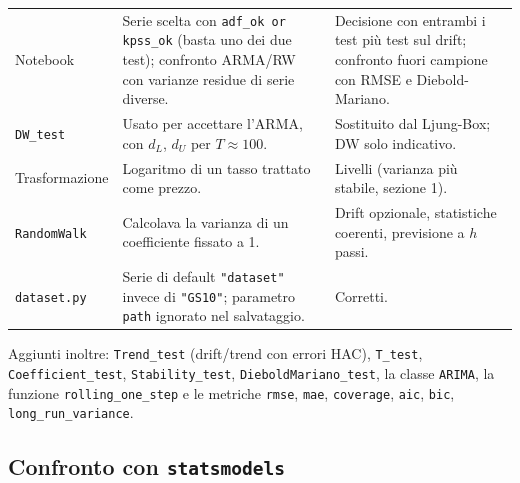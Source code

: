 \documentclass[11pt,a4paper]{article}
\begin{document}
\begin{center}
\begin{tabular}{>{\raggedright\arraybackslash}p{3.2cm}>{\raggedright\arraybackslash}p{5.9cm}>{\raggedright\arraybackslash}p{5.5cm}}
Notebook & Serie scelta con \texttt{adf\_ok or kpss\_ok} (basta uno dei due test); confronto ARMA/RW con varianze residue di serie diverse. & Decisione con entrambi i test più test sul drift; confronto fuori campione con RMSE e Diebold-Mariano. \\
\texttt{DW\_test} & Usato per accettare l'ARMA, con $d_L$, $d_U$ per $T\approx100$. & Sostituito dal Ljung-Box; DW solo indicativo. \\
Trasformazione & Logaritmo di un tasso trattato come prezzo. & Livelli (varianza più stabile, sezione 1). \\
\texttt{RandomWalk} & Calcolava la varianza di un coefficiente fissato a 1. & Drift opzionale, statistiche coerenti, previsione a $h$ passi. \\
\texttt{dataset.py} & Serie di default \texttt{"dataset"} invece di \texttt{"GS10"}; parametro \texttt{path} ignorato nel salvataggio. & Corretti. \\
\bottomrule
\end{tabular}
\end{center}

{\sloppy Aggiunti inoltre: \texttt{Trend\_test} (drift/trend con errori HAC), \texttt{T\_test}, \texttt{Coefficient\_test}, \texttt{Stability\_test}, \texttt{DieboldMariano\_test}, la classe \texttt{ARIMA}, la funzione \texttt{rolling\_one\_step} e le metriche \texttt{rmse}, \texttt{mae}, \texttt{coverage}, \texttt{aic}, \texttt{bic}, \texttt{long\_run\_variance}.\par}

\subsection{Confronto con \texttt{statsmodels}}
\end{document}
